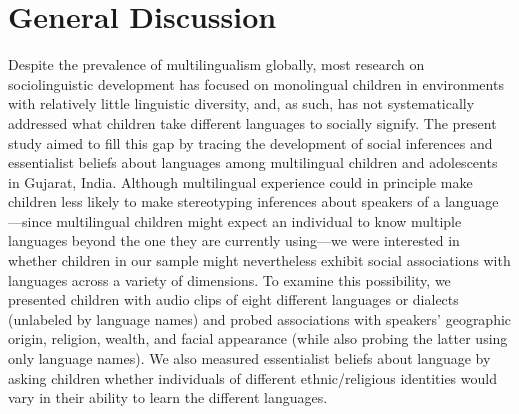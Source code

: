 \documentclass{foushee-adapted-preprint}
\begin{document}
\section*{General Discussion}
Despite the prevalence of multilingualism globally, most research on sociolinguistic development has focused on monolingual children in environments with relatively little linguistic diversity, and, as such, has not systematically addressed what children take different languages to socially signify. The present study aimed to fill this gap by tracing the development of social inferences and essentialist beliefs about languages among multilingual children and adolescents in Gujarat, India. Although multilingual experience could in principle make children less likely to make stereotyping inferences about speakers of a language---since multilingual children might expect an individual to know multiple languages beyond the one they are currently using---we were interested in whether children in our sample might nevertheless exhibit social associations with languages across a variety of dimensions. To examine this possibility, we presented children with audio clips of eight different languages or dialects (unlabeled by language names) and probed associations with speakers' geographic origin, religion, wealth, and facial appearance (while also probing the latter using only language names). We also measured essentialist beliefs about language by asking children whether individuals of different ethnic/religious identities would vary in their ability to learn the different languages.
\end{document}
